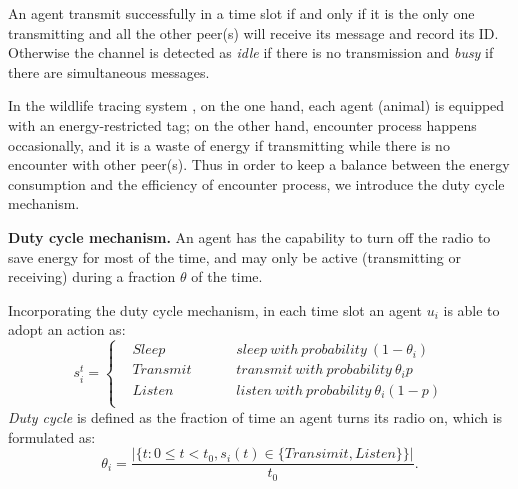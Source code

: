 An agent transmit successfully in a time slot if and only if 
it is the only one transmitting and all the other peer(s) will
receive its message and record its ID. Otherwise the channel is detected
as \emph{idle} if there is no transmission and \emph{busy} if there 
are simultaneous messages.

In the wildlife tracing system {\sysname}, 
on the one hand,
each agent (animal) is equipped with an energy-restricted tag;
on the other hand, encounter process happens occasionally, and
it is a waste of energy if transmitting while there is no encounter with other peer(s). 
Thus in order to keep a balance between the energy consumption 
and the efficiency of encounter process, we introduce the duty cycle mechanism.

\textbf{Duty cycle mechanism.} 
An agent has the capability to turn off the radio to save
energy for most of the time, and may only be active 
(transmitting or receiving) during a fraction $\theta$ of the time.

Incorporating the duty cycle mechanism, in each time slot an agent $u_i$ is able to adopt an action as:
$$ s_i^t=\left\{
\begin{aligned}
&Sleep  & & & &{sleep~ with~ probability~ (1-\theta_i)}  	 \\
&Transmit  & & & &{transmit~ with~ probability~ \theta_i p}	\\
&Listen  & & & &{listen~ with~ probability~\theta_i(1-p)}	\\
\end{aligned}
\right.
$$
\emph{Duty cycle} is defined as the fraction of time an agent turns its radio on, 
which is formulated as:
$$\theta_i=\frac{|\{t: 0\leq t<t_0, s_i(t) \in \{Transimit,Listen\}\}|}{t_0}.
$$



